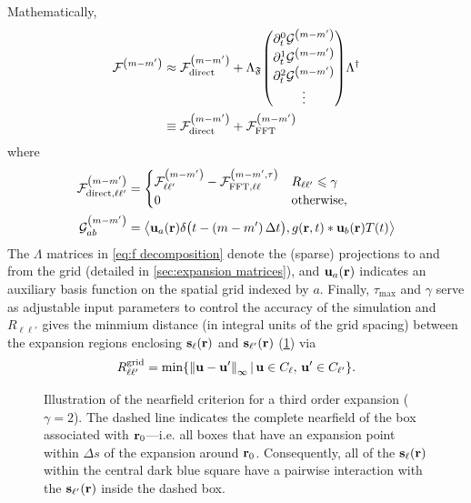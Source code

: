 Mathematically,
\begin{equation}
  \begin{aligned}
    \mathcal{F}^\qty(m - m') & \approx \mathcal{F}^\qty(m-m')_\text{direct} + \Lambda_\mathfrak{F} \mqty(\partial_t^0 \mathcal{G}^\qty(m-m') \\ \partial_t^1 \mathcal{G}^\qty(m-m') \\ \partial_t^2 \mathcal{G}^\qty(m-m') \\ \vdots) \Lambda^\dagger \\
                             & \equiv \mathcal{F}^\qty(m-m')_\text{direct} + \mathcal{F}^\qty(m-m')_\text{FFT}
    \end{aligned}
  \label{eq:f decomposition}
\end{equation}
where
\begin{subequations}
  \begin{align}
    \mathcal{F}^\qty(m-m')_{\text{direct},\ell\ell'} &= \begin{cases}
      \mathcal{F}^\qty(m-m')_{\ell\ell'}  - \mathcal{F}^\qty(m-m',\tau)_{\text{FFT},\ell\ell} & R_{\ell\ell'} \leqslant \gamma \\
      0 & \text{otherwise},
    \end{cases} \\
    \mathcal{G}^\qty(m-m')_{ab} &= \left< \vb{u}_a(\vb{r})\delta\qty\big(t - (m-m')\, \Delta t), g(\vb{r}, t) \ast \vb{u}_{b}(\vb{r})T(t) \right>
  \end{align}
  \label{eq:decomposition elements}
\end{subequations}
The $\Lambda$ matrices in \cref{eq:f decomposition} denote the (sparse) projections to and from the grid (detailed in \cref{sec:expansion matrices}), and $\vb{u}_a(\vb{r})$ indicates an auxiliary basis function on the spatial grid indexed by $a$.
Finally, $\tau_\text{max}$ and $\gamma$ serve as adjustable input parameters to control the accuracy of the simulation and $R_{\ell\ell'}$ gives the minmium distance (in integral units of the grid spacing) between the expansion regions enclosing $\vb{s}_\ell(\vb{r})$ and $\vb{s}_{\ell'}(\vb{r})$ (\cref{fig:nearfield criterion}) via
\begin{equation}
  R^\text{grid}_{\ell\ell'} = \min\!\qty{\norm{\vb{u} - \vb{u}'}_\infty \, | \, \vb{u} \in C_\ell, \, \vb{u}' \in C_{\ell'}}.
\end{equation}

\begin{figure}
  \centering
  \caption{\label{fig:nearfield criterion}Illustration of the nearfield criterion for a third order expansion ($\gamma = 2$).
    The dashed line indicates the complete nearfield of the box associated with \textcolor{cbblue}{$\vb{r}_0$}---i.e. all boxes that have an expansion point within $\Delta s$ of the expansion around \textcolor{cbblue}{$\vb{r}_0$}.
    Consequently, all of the $\vb{s}_\ell(\vb{r})$ within the central dark blue square have a pairwise interaction with the $\vb{s}_{\ell'}(\vb{r})$ inside the dashed box.
  }
\end{figure}

